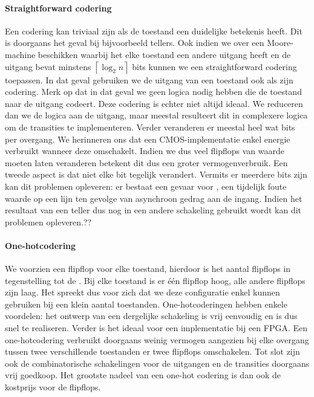 \paragraph{Straightforward codering}Een codering kan triviaal zijn als de toestand een duidelijke betekenis heeft. Dit is doorgaans het geval bij bijvoorbeeld tellers. Ook indien we over een Moore-machine beschikken waarbij het elke toestand een andere uitgang heeft en de uitgang bevat minstens $\left\lceil\log_2 n\right\rceil$ bits kunnen we een straightforward codering toepassen. In dat geval gebruiken we de uitgang van een toestand ook als zijn codering. Merk op dat in dat geval we geen logica nodig hebben die de toestand naar de uitgang codeert. Deze codering is echter niet altijd ideaal. We reduceren dan we de logica aan de uitgang, maar meestal resulteert dit in complexere logica om de transities te implementeren. Verder veranderen er meestal heel wat bits per overgang. We herinneren ons dat een CMOS-implementatie enkel energie verbruikt wanneer deze omschakelt. Indien we dus veel flipflops van waarde moeten laten veranderen betekent dit dus een groter vermogenverbruik. Een tweede aspect is dat niet elke bit tegelijk verandert. Vermits er meerdere bits zijn kan dit problemen opleveren: er bestaat een gevaar voor , een tijdelijk foute waarde op een lijn ten gevolge van asynchroon gedrag aan de ingang. Indien het resultaat van een teller dus nog in een andere schakeling gebruikt wordt kan dit problemen opleveren.??%
\paragraph{One-hotcodering}We voorzien een flipflop voor elke toestand, hierdoor is het aantal flipflops  in tegenstelling tot de . Bij elke toestand is er \'e\'en flipflop hoog, alle andere flipflops zijn laag. Het spreekt dus voor zich dat we deze configuratie enkel kunnen gebruiken bij een klein aantal toestanden. One-hotcoderingen hebben enkele voordelen: het ontwerp van een dergelijke schakeling is vrij eenvoudig en is dus snel te realiseren. Verder is het ideaal voor een implementatie bij een FPGA. Een one-hotcodering verbruikt doorgaans weinig vermogen aangezien bij elke overgang tussen twee verschillende toestanden er twee flipflops omschakelen. Tot slot zijn ook de combinatorische schakelingen voor de uitgangen en de transities doorgaans vrij goedkoop. Het grootste nadeel van een one-hot codering is dan ook de kostprijs voor de flipflops.
